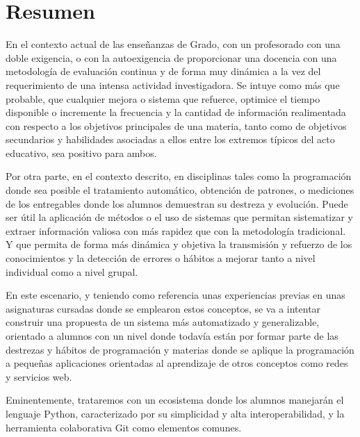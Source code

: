 
\chapter*{Resumen}

En el contexto actual de las enseñanzas de Grado, con un profesorado con una doble exigencia, o con la autoexigencia de proporcionar una docencia con una metodología de evaluación continua y de forma muy dinámica a la vez del requerimiento de una intensa actividad investigadora. Se intuye como más que probable, que cualquier mejora o sistema que refuerce, optimice el tiempo disponible o incremente la frecuencia y la cantidad de información realimentada con respecto a los objetivos principales de una materia, tanto como de objetivos secundarios y habilidades asociadas a ellos entre los extremos típicos del acto educativo, sea positivo para ambos.

Por otra parte, en el contexto descrito, en disciplinas tales como la programación donde sea posible el tratamiento automático, obtención de patrones, o mediciones de los entregables donde los alumnos demuestran su destreza y evolución. Puede ser útil la aplicación de métodos o el uso de sistemas que permitan sistematizar y extraer información valiosa con más rapidez que con la metodología tradicional. Y que permita de forma más dinámica y objetiva la transmisión y refuerzo de los conocimientos y la detección de errores o hábitos a mejorar tanto a nivel individual como a nivel grupal.

En este escenario, y teniendo como referencia unas experiencias previas en unas asignaturas cursadas donde se emplearon estos conceptos, se va a intentar construir una propuesta de un sistema más automatizado y generalizable, orientado a alumnos con un nivel donde todavía están por formar parte de las destrezas y hábitos de programación y materias donde se aplique la programación a pequeñas aplicaciones  orientadas al aprendizaje de otros conceptos como redes y servicios web.

Eminentemente, trataremos con un ecosistema donde los alumnos manejarán el lenguaje Python, caracterizado por su simplicidad y alta interoperabilidad, y la herramienta colaborativa Git como elementos comunes.



